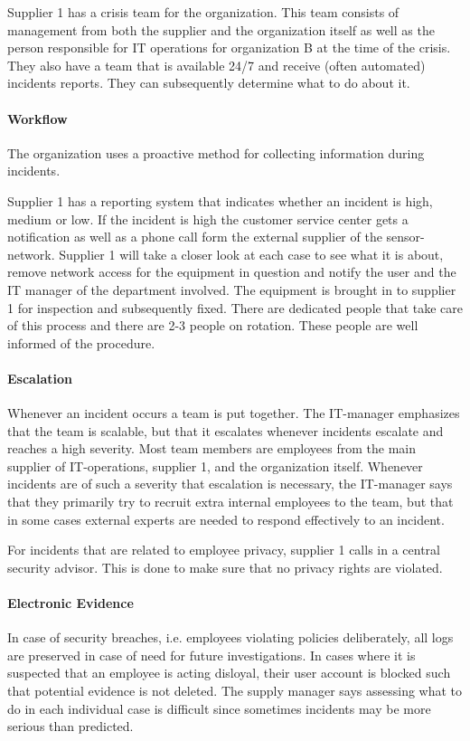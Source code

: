 Supplier 1 has a crisis team for the organization. This team consists of management from both the supplier and the organization itself as well as the person responsible for IT operations for organization B at the time of the crisis. They also have a team that is available 24/7 and receive (often automated) incidents reports. They can subsequently determine what to do about it.

\paragraph{Workflow}
The organization uses a proactive method for collecting information during incidents. %

Supplier 1 has a reporting system that indicates whether an incident is high, medium or low. If the incident is high the customer service center gets a notification as well as a phone call form the external supplier of the sensor-network. Supplier 1 will take a closer look at each case to see what it is about, remove network access for the equipment in question and notify the user and the IT manager of the department involved. The equipment is brought in to supplier 1 for inspection and subsequently fixed. There are dedicated people that take care of this process and there are 2-3 people on rotation. These people are well informed of the procedure.  

\paragraph{Escalation}
Whenever an incident occurs a team is put together. The IT-manager emphasizes that the team is scalable, but that it escalates whenever incidents escalate and reaches a high severity. Most team members are employees from the main supplier of IT-operations, supplier 1, and the organization itself. Whenever incidents are of such a severity that escalation is necessary, the IT-manager says that they primarily try to recruit extra internal employees to the team, but that in some cases external experts are needed to respond effectively to an incident.

For incidents that are related to employee privacy, supplier 1 calls in a central security advisor. This is done to make sure that no privacy rights are violated.

\paragraph{Electronic Evidence}
In case of security breaches, i.e. employees violating policies deliberately, all logs are preserved in case of need for future investigations. In cases where it is suspected that an employee is acting disloyal, their user account is blocked such that potential evidence is not deleted. The supply manager says assessing what to do in each individual case is difficult since sometimes incidents may be more serious than predicted. 

